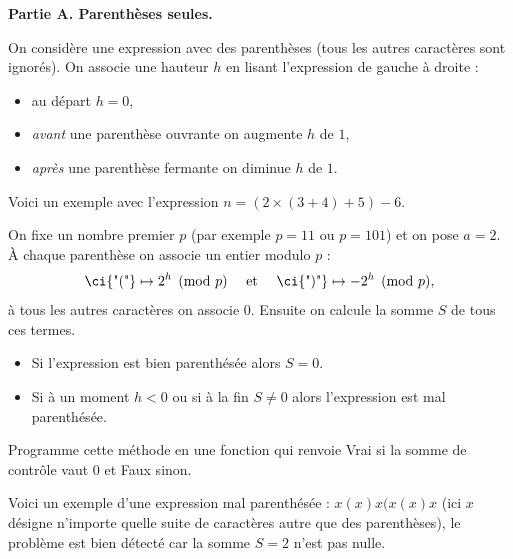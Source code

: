 \documentclass[10pt,class=report,crop=false]{standalone}
\begin{document}
\begin{activite}
	


\textbf{Partie A. Parenthèses seules.}

On considère une expression avec des parenthèses (tous les autres caractères sont ignorés). 
On associe une hauteur $h$ en lisant l'expression de gauche à droite :
\begin{itemize}
	\item au départ $h=0$,
	\item \emph{avant} une parenthèse ouvrante  on augmente $h$ de $1$,
	\item \emph{après} une parenthèse fermante  on diminue $h$ de $1$.
\end{itemize}

Voici un exemple avec l'expression \og{}$n=(2\times(3+4)+5)-6$\fg{}.


On fixe un nombre premier $p$ (par exemple $p=11$ ou $p=101$) et on pose $a=2$.
\`A chaque parenthèse on associe un entier modulo $p$ :
$$ \text{\ci{"("}} \mapsto 2^h \pmod{p} \quad \text{ et }\quad \text{\ci{")"}} \mapsto -2^h \pmod{p},$$
à tous les autres caractères on associe $0$. Ensuite on calcule la somme $S$ de tous ces termes.


\begin{itemize}
 \item Si l'expression est bien parenthésée alors $S=0$.
 \item Si à un moment $h<0$ ou si à la fin $S \neq 0$ alors l'expression est mal parenthésée.
\end{itemize}

\bigskip

Programme cette méthode en une fonction  qui renvoie
\og{}Vrai\fg{} si la somme de contrôle vaut $0$ et \og{}Faux\fg{} sinon.


Voici un exemple d'une expression mal parenthésée : \og{}$x(x)x(x(x)x$\fg{} (ici $x$ désigne n'importe quelle suite de caractères autre que des parenthèses), le problème est bien détecté car la somme $S=2$ n'est pas nulle.


\bigskip


\end{activite}
\end{document}
